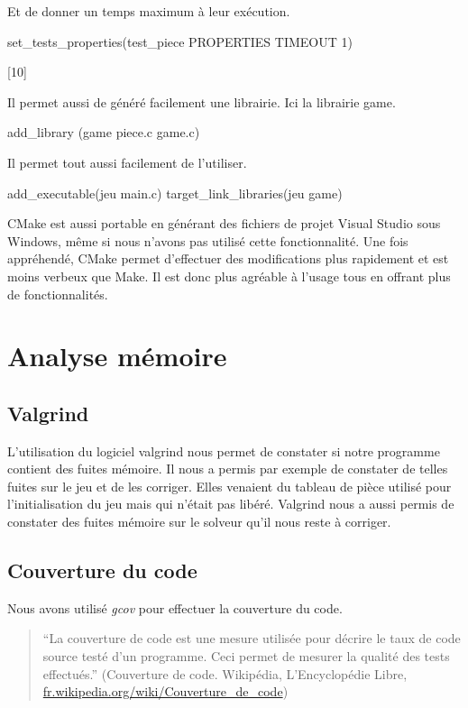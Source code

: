 \documentclass{report}
\begin{document}
\noindent
Et de donner un temps maximum à leur exécution.
\begin{verbatimtab}[10]
set\_tests\_properties(test\_piece PROPERTIES TIMEOUT 1)
\end{verbatimtab}[10]

\noindent
Il permet aussi de généré facilement une librairie. Ici la librairie game.
\begin{verbatimtab}[10]
add_library (game piece.c game.c)
\end{verbatimtab}

\noindent
Il permet tout aussi facilement de l’utiliser.
\begin{verbatimtab}[10]
add_executable(jeu main.c)
target_link_libraries(jeu game)
\end{verbatimtab}

CMake est aussi portable en générant des fichiers de projet Visual Studio sous Windows, même si nous n’avons pas utilisé cette fonctionnalité. Une fois appréhendé, CMake permet d’effectuer des modifications plus rapidement et est moins verbeux que Make. Il est donc plus agréable à l’usage tous en offrant plus de fonctionnalités.

\chapter{Analyse mémoire}
\section{Valgrind}
L'utilisation du logiciel valgrind nous permet de constater si notre programme contient des fuites mémoire. Il nous a permis par exemple de constater de telles fuites sur le jeu et de les corriger. Elles venaient du tableau de pièce utilisé pour l'initialisation du jeu mais qui n'était pas libéré. Valgrind nous a aussi permis de constater des fuites mémoire sur le solveur qu'il nous reste à corriger.
\section{Couverture du code} 
Nous avons utilisé \emph{gcov} pour effectuer la couverture du code.

\small
\begin{quotation}
``La couverture de code est une mesure utilisée pour décrire le taux de code source testé d'un programme. Ceci permet de mesurer la qualité des tests effectués.'' (Couverture de code. Wikipédia, L'Encyclopédie Libre, \url{fr.wikipedia.org/wiki/Couverture_de_code})
\end{quotation}
\normalsize
\end{document}
